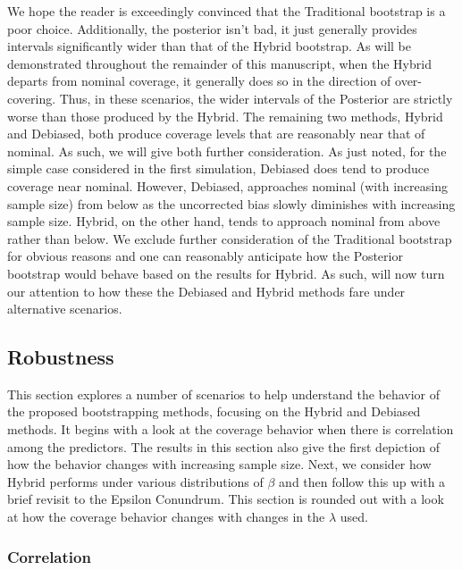 We hope the reader is exceedingly convinced that the Traditional bootstrap is a poor choice. Additionally, the posterior isn't bad, it just generally provides intervals significantly wider than that of the Hybrid bootstrap. As will be demonstrated throughout the remainder of this manuscript, when the Hybrid departs from nominal coverage, it generally does so in the direction of over-covering. Thus, in these scenarios, the wider intervals of the Posterior are strictly worse than those produced by the Hybrid.  The remaining two methods, Hybrid and Debiased, both produce coverage levels that are reasonably near that of nominal. As such, we will give both further consideration. As just noted, for the simple case considered in the first simulation, Debiased does tend to produce coverage near nominal. However, Debiased, approaches nominal (with increasing sample size) from below as the uncorrected bias slowly diminishes with increasing sample size. Hybrid, on the other hand, tends to approach nominal from above rather than below. We exclude further consideration of the Traditional bootstrap for obvious reasons and one can reasonably anticipate how the Posterior bootstrap would behave based on the results for Hybrid. As such, will now turn our attention to how these the Debiased and Hybrid methods fare under alternative scenarios. 

\subsection{Robustness}
\label{Sec:robustness}

This section explores a number of scenarios to help understand the behavior of the proposed bootstrapping methods, focusing on the Hybrid and Debiased methods. It begins with a look at the coverage behavior when there is correlation among the predictors. The results in this section also give the first depiction of how the behavior changes with increasing sample size. Next, we consider how Hybrid performs under various distributions of $\beta$ and then follow this up with a brief revisit to the Epsilon Conundrum. This section is rounded out with a look at how the coverage behavior changes with changes in the $\lambda$ used.


\subsubsection{Correlation}
\label{Sec:correlation}

